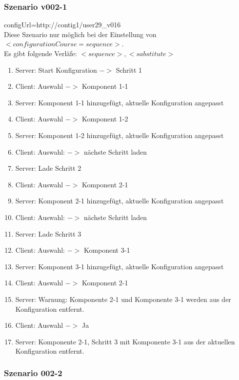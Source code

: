 \documentclass{article}
\begin{document}
\subsubsection{Szenario v002-1}

configUrl=http://contig1/user29\_v016\\

Diese Szenario nur m\"oglich bei der Einstellung von
$<configurationCourse=sequence>$.\\

\noindent Es gibt folgende Verl\"afe: $<sequence>, <sabstitute>$

\begin{enumerate}
  \item Server: Start Konfiguration $->$ Schritt 1
  \item Client: Auswahl $->$ Komponent 1-1
  \item Server: Komponent 1-1 hinzugef\"ugt, aktuelle Konfiguration angepasst
  \item Client: Auswahl $->$ Komponent 1-2
  \item Server: Komponent 1-2 hinzugef\"ugt, aktuelle Konfiguration angepasst
  \item Client: Auswahl: $->$ n\"achste Schritt laden
  \item Server: Lade Schritt 2
  \item Client: Auswahl $->$ Komponent 2-1
  \item Server: Komponent 2-1 hinzugef\"ugt, aktuelle Konfiguration angepasst
  \item Client: Auswahl: $->$ n\"achste Schritt laden
  \item Server: Lade Schritt 3
  \item Client: Auswahl: $->$ Komponent 3-1
  \item Server: Komponent 3-1 hinzugef\"ugt, aktuelle Konfiguration angepasst
  \item Client: Auswahl $->$ Komponent 2-1
  \item Server: Warnung: Komponente 2-1 und Komponente 3-1 werden aus der
  Konfiguration entfernt.
  \item Client: Auswahl $->$ Ja
  \item Server: Komponente 2-1, Schritt 3 mit Komponente 3-1 aus der aktuellen
  Konfiguration entfernt.
\end{enumerate}

\subsubsection{Szenario 002-2}
\end{document}
